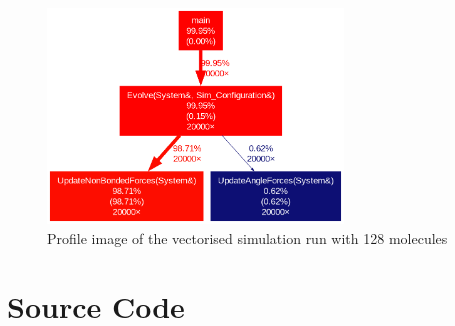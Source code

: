 \documentclass{article}
\begin{document}
\begin{figure}
    \includegraphics[width=0.7\textwidth]{Images/vec_128mol_profile.png
    }
    \centering
    \caption{Profile image of the vectorised simulation run with 128 molecules}
    \label{fig: vec profile 128 molecule}
\end{figure}



\section*{Source Code}

\end{document}
